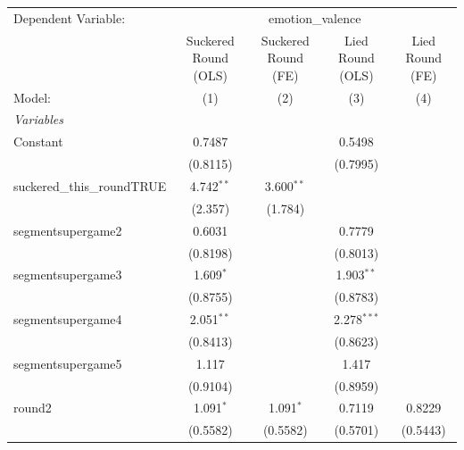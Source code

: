 
\begingroup
\centering
\begin{tabular}{lcccc}
   \tabularnewline \midrule \midrule
   Dependent Variable: & \multicolumn{4}{c}{emotion\_valence}\\
                                & Suckered Round (OLS) & Suckered Round (FE) & Lied Round (OLS) & Lied Round (FE) \\   
   Model:                       & (1)                  & (2)                 & (3)              & (4)\\  
   \midrule
   \emph{Variables}\\
   Constant                     & 0.7487               &                     & 0.5498           &   \\   
                                & (0.8115)             &                     & (0.7995)         &   \\   
   suckered\_this\_roundTRUE    & 4.742$^{**}$         & 3.600$^{**}$        &                  &   \\   
                                & (2.357)              & (1.784)             &                  &   \\   
   segmentsupergame2            & 0.6031               &                     & 0.7779           &   \\   
                                & (0.8198)             &                     & (0.8013)         &   \\   
   segmentsupergame3            & 1.609$^{*}$          &                     & 1.903$^{**}$     &   \\   
                                & (0.8755)             &                     & (0.8783)         &   \\   
   segmentsupergame4            & 2.051$^{**}$         &                     & 2.278$^{***}$    &   \\   
                                & (0.8413)             &                     & (0.8623)         &   \\   
   segmentsupergame5            & 1.117                &                     & 1.417            &   \\   
                                & (0.9104)             &                     & (0.8959)         &   \\   
   round2                       & 1.091$^{*}$          & 1.091$^{*}$         & 0.7119           & 0.8229\\   
                                & (0.5582)             & (0.5582)            & (0.5701)         & (0.5443)\\   

\end{tabular}
